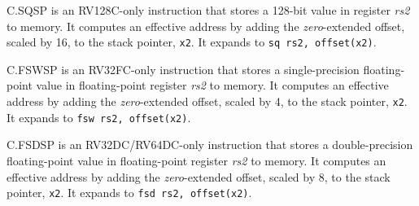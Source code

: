 C.SQSP is an RV128C-only instruction that stores a 128-bit value in register
{\em rs2} to memory.  It computes an effective address by adding the {\em
zero}-extended offset, scaled by 16, to the stack pointer, {\tt x2}.
It expands to {\tt sq rs2, offset(x2)}.

C.FSWSP is an RV32FC-only instruction that stores a single-precision
floating-point value in floating-point register {\em rs2} to memory.  It
computes an effective address by adding the {\em zero}-extended offset, scaled
by 4, to the stack pointer, {\tt x2}.  It expands to {\tt fsw rs2,
offset(x2)}.

C.FSDSP is an RV32DC/RV64DC-only instruction that stores a double-precision
floating-point value in floating-point register {\em rs2} to memory.  It
computes an effective address by adding the {\em zero}-extended offset, scaled
by 8, to the stack pointer, {\tt x2}.  It expands to {\tt fsd rs2,
offset(x2)}.

